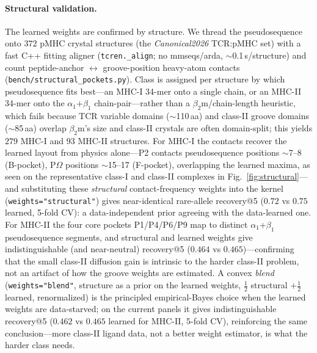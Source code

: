 \documentclass[11pt]{article}
\theoremstyle{oldplain}
\theoremstyle{oldrem}
\begin{document}
\paragraph{Structural validation.} The learned weights are confirmed by structure. We thread the
pseudosequence onto $372$ pMHC crystal structures (the \emph{Canonical2026} TCR:pMHC set) with a
fast C++ fitting aligner (\texttt{tcren.\_align}; no mmseqs/arda, $\sim$0.1\,s/structure) and count
peptide-anchor $\leftrightarrow$ groove-position heavy-atom contacts
(\texttt{bench/structural\_pockets.py}). Class is assigned per structure by which pseudosequence fits
best---an MHC-I 34-mer onto a single chain, or an MHC-II 34-mer onto the $\alpha_1$+$\beta_1$
chain-pair---rather than a $\beta_2$m/chain-length heuristic, which fails because TCR variable domains
($\sim$110\,aa) and class-II groove domains ($\sim$85\,aa) overlap $\beta_2$m's size and class-II
crystals are often domain-split; this yields $279$ MHC-I and $93$ MHC-II structures. For MHC-I the
contacts recover the learned layout from physics alone---P2 contacts pseudosequence positions
$\sim$7--8 (B-pocket), P$\Omega$ positions $\sim$15--17 (F-pocket), overlapping the learned maxima,
as seen on the representative class-I and class-II complexes in Fig.~\ref{fig:structural}---and
substituting these \emph{structural} contact-frequency weights into the kernel
(\texttt{weights="structural"}) gives near-identical rare-allele recovery@5 ($0.72$ vs $0.75$ learned,
5-fold CV): a data-independent prior agreeing with the data-learned one. For MHC-II the four core
pockets P1/P4/P6/P9 map to distinct $\alpha_1$+$\beta_1$ pseudosequence segments, and structural and
learned weights give indistinguishable (and near-neutral) recovery@5 ($0.464$ vs $0.465$)---confirming
that the small class-II diffusion gain is intrinsic to the harder class-II problem, not an artifact of
how the groove weights are estimated. A convex \emph{blend} (\texttt{weights="blend"}, structure as a
prior on the learned weights, $\tfrac12$ structural $+\tfrac12$ learned, renormalized) is the
principled empirical-Bayes choice when the learned weights are data-starved; on the current panels it
gives indistinguishable recovery@5 ($0.462$ vs $0.465$ learned for MHC-II, 5-fold CV), reinforcing the
same conclusion---more class-II ligand data, not a better weight estimator, is what the harder class
needs.
\end{document}
